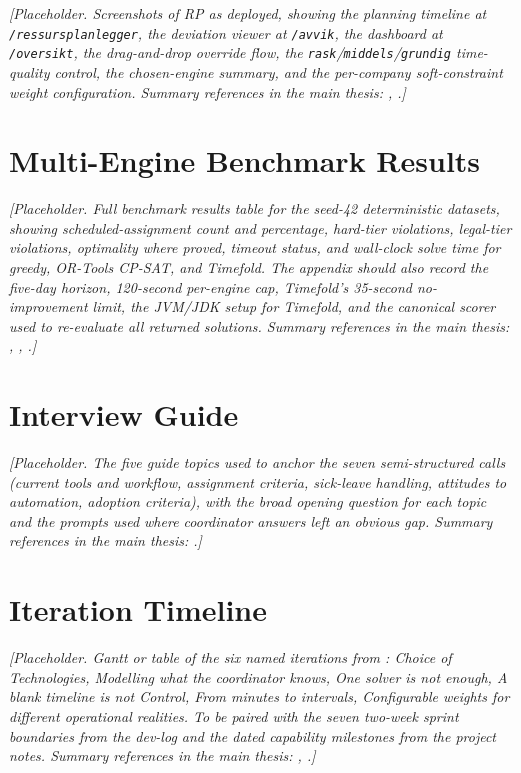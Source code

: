 \textit{[Placeholder. Screenshots of RP as deployed, showing the planning timeline at \texttt{/ressursplanlegger}, the deviation viewer at \texttt{/avvik}, the dashboard at \texttt{/oversikt}, the drag-and-drop override flow, the \texttt{rask}/\texttt{middels}/\texttt{grundig} time-quality control, the chosen-engine summary, and the per-company soft-constraint weight configuration. Summary references in the main thesis: , .]}


\section{Multi-Engine Benchmark Results}
\label{app:benchmark}

\textit{[Placeholder. Full benchmark results table for the seed-42 deterministic datasets, showing scheduled-assignment count and percentage, hard-tier violations, legal-tier violations, optimality where proved, timeout status, and wall-clock solve time for greedy, OR-Tools CP-SAT, and Timefold. The appendix should also record the five-day horizon, 120-second per-engine cap, Timefold's 35-second no-improvement limit, the JVM/JDK setup for Timefold, and the canonical scorer used to re-evaluate all returned solutions. Summary references in the main thesis: , , .]}


\section{Interview Guide}
\label{app:interview-guide}

\textit{[Placeholder. The five guide topics used to anchor the seven semi-structured calls (current tools and workflow, assignment criteria, sick-leave handling, attitudes to automation, adoption criteria), with the broad opening question for each topic and the prompts used where coordinator answers left an obvious gap. Summary references in the main thesis: .]}


\section{Iteration Timeline}
\label{app:iterations}

\textit{[Placeholder. Gantt or table of the six named iterations from : Choice of Technologies, Modelling what the coordinator knows, One solver is not enough, A blank timeline is not Control, From minutes to intervals, Configurable weights for different operational realities. To be paired with the seven two-week sprint boundaries from the dev-log and the dated capability milestones from the project notes. Summary references in the main thesis: , .]}


